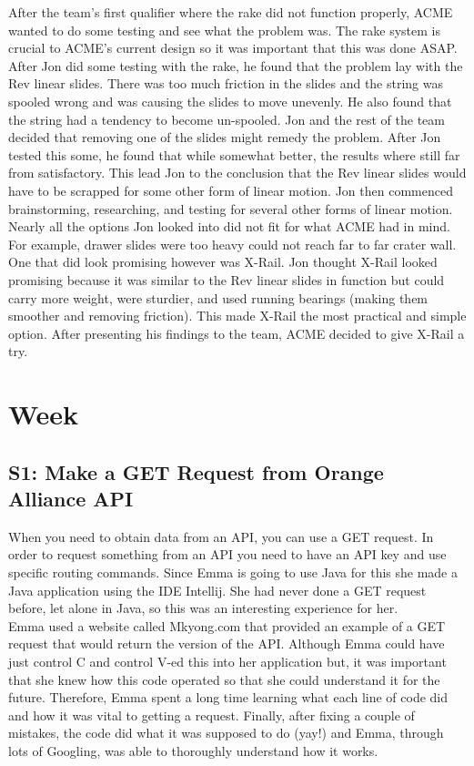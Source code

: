 \documentclass{article}
\begin{document}
After the team's first qualifier where the rake did not function properly, ACME wanted to do some testing and see what the problem was. The rake system is crucial to ACME's current design so it was important that this was done ASAP. After Jon did some testing with the rake, he found that the problem lay with the Rev linear slides. There was too much friction in the slides and the string was spooled wrong and was causing the slides to move unevenly. He also found that the string had a tendency to become un-spooled. Jon and the rest of the team decided that removing one of the slides might remedy the problem. After Jon tested this some, he found that while somewhat better, the results where still far from satisfactory. This lead Jon to the conclusion that the Rev linear slides would have to be scrapped for some other form of linear motion. Jon then commenced brainstorming, researching, and testing for several other forms of linear motion. Nearly all the options Jon looked into did not fit for what ACME had in mind. For example, drawer slides were too heavy could not reach far to far crater wall. One that did look promising however was X-Rail. Jon thought X-Rail looked promising because it was similar to the Rev linear slides in function but could carry more weight, were sturdier, and used running bearings (making them smoother and removing friction). This made X-Rail the most practical and simple option. After presenting his findings to the team, ACME decided to give X-Rail a try. 
\clearpage \newpage \section{Week \thesection} 
\subsection{S1: Make a GET Request from Orange Alliance API}

When you need to obtain data from an API, you can use a GET request. In order to request something from an API you need to have an API key and use specific routing commands. Since Emma is going to use Java for this she made a Java application using the IDE Intellij. She had never done a GET request before, let alone in Java, so this was an interesting experience for her. \\

Emma used a website called Mkyong.com that provided an example of a GET request that would return the version of the API. Although Emma could have just control C and control V-ed this into her application but, it was important that she knew how this code operated so that she could understand it for the future. Therefore, Emma spent a long time learning what each line of code did and how it was vital to getting a request. Finally, after fixing a couple of mistakes, the code did what it was supposed to do (yay!) and Emma, through lots of Googling, was able to thoroughly understand how it works. \\
\end{document}
